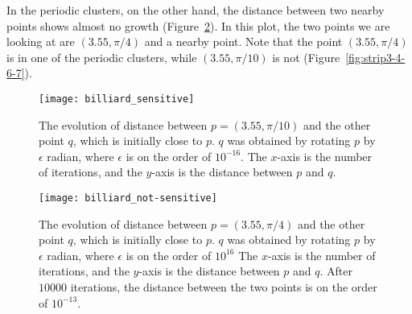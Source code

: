 \documentclass[10pt,twoside]{book}
\begin{document}
In the periodic clusters, on the other hand, the distance between two nearby points shows almost no growth (Figure~\ref{fig:sensitivity2}).
In this plot, the two points we are looking at are $(3.55,\pi/4)$ and a nearby point.
Note that the point $(3.55,\pi/4)$ is in one of the periodic clusters, while $(3.55,\pi/10)$ is not (Figure~\ref{fig:strip3-4-6-7}).

\begin{figure}[ht]
  \begin{center}
    \texttt{[image: billiard\_sensitive]}
    \caption{The evolution of distance between $p = (3.55, \pi/10)$ and the other point $q$, which is initially close to $p$.
      $q$ was obtained by rotating $p$ by $\epsilon$ radian, where $\epsilon$ is on the order of $10^{-16}$.
      The $x$-axis is the number of iterations, and the $y$-axis is the distance between $p$ and $q$.
    }
    \label{fig:sensitivity1}
  \end{center}
\end{figure}
\begin{figure}[ht]
  \begin{center}
    \texttt{[image: billiard\_not-sensitive]}
    \caption{The evolution of distance between $p = (3.55, \pi/4)$ and the other point $q$, which is initially close to $p$.
      $q$ was obtained by rotating $p$ by $\epsilon$ radian, where $\epsilon$ is on the order of $10^{16}$
      The $x$-axis is the number of iterations, and the $y$-axis is the distance between $p$ and $q$.
      After $10000$ iterations, the distance between the two points is on the order of $10^{-13}$.
    }
    \label{fig:sensitivity2}
  \end{center}
\end{figure}




\printindex
\end{document}
